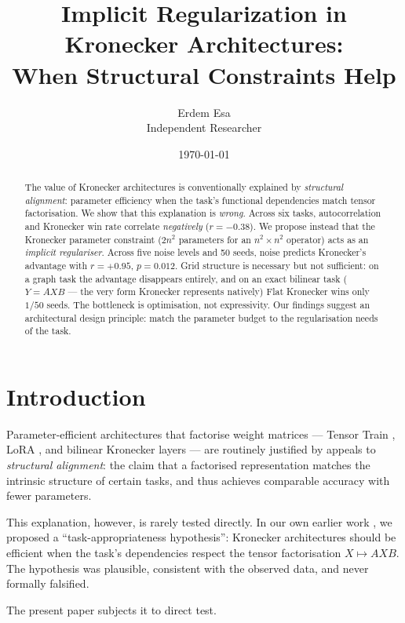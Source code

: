 \documentclass[11pt,a4paper]{article}
\title{Implicit Regularization in Kronecker Architectures:\\
When Structural Constraints Help}
\author{Erdem Esa\\ \small Independent Researcher}
\date{\today}
\begin{document}
\maketitle

\begin{abstract}
The value of Kronecker architectures is conventionally explained by
\emph{structural alignment}: parameter efficiency when the task's
functional dependencies match tensor factorisation. We show that this
explanation is \emph{wrong}. Across six tasks, autocorrelation and
Kronecker win rate correlate \emph{negatively} ($r = -0.38$). We
propose instead that the Kronecker parameter constraint
($2n^2$ parameters for an $n^2 \times n^2$ operator) acts as an
\emph{implicit regulariser}. Across five noise levels and 50 seeds,
noise predicts Kronecker's advantage with $r = +0.95$, $p = 0.012$.
Grid structure is necessary but not sufficient: on a graph task the
advantage disappears entirely, and on an exact bilinear task
($Y = AXB$ --- the very form Kronecker represents natively) Flat
Kronecker wins only $1/50$ seeds. The bottleneck is optimisation,
not expressivity. Our findings suggest an architectural design
principle: match the parameter budget to the regularisation needs
of the task.
\end{abstract}


\section{Introduction}
\label{sec:intro}

Parameter-efficient architectures that factorise weight matrices
--- Tensor Train \cite{novikov2015tensor}, LoRA \cite{hu2021lora},
and bilinear Kronecker layers \cite{tolstikhin2021mlp} --- are
routinely justified by appeals to \emph{structural alignment}: the
claim that a factorised representation matches the intrinsic
structure of certain tasks, and thus achieves comparable accuracy
with fewer parameters.

This explanation, however, is rarely tested directly. In our own
earlier work \cite{esa2026preprint2}, we proposed a
``task-appropriateness hypothesis'': Kronecker architectures
should be efficient when the task's dependencies respect the
tensor factorisation $X \mapsto AXB$. The hypothesis was plausible,
consistent with the observed data, and never formally falsified.

The present paper subjects it to direct test.
\end{document}
